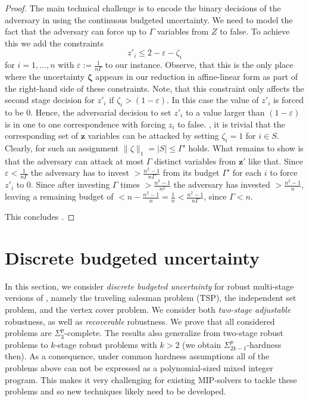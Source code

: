 \begin{proof}
    The main technical challenge is to encode the binary decisions of the adversary 
    in {\radj} using the continuous budgeted uncertainty.
    We need to model the fact that the adversary can force up to $\Gamma$ variables from $Z$ to false.
    To achieve this we add the constraints
    \[ z'_i \leq 2 - \varepsilon - \zeta_i \]
    for $i=1,\dots,n$ with $\varepsilon := \frac{1}{n \Gamma}$ to our instance.
    Observe, that this is the only place where the uncertainty $\pmb{\zeta}$ appears in our 
    reduction  in affine-linear form as part of the right-hand side of these constraints.
    Note, that this constraint only affects the second stage decision for $z'_i$ if 
    $\zeta_i > (1-\varepsilon)$. In this case the value of $z'_i$ is forced to be $0$. Hence, the adversarial decision to set $z'_i$ to a value larger 
    than $(1-\varepsilon)$ is in one to one correspondence with forcing $z_i$ to false.
    ,
    it is trivial that the corresponding set of $\pmb{z}$ variables can be attacked by 
    setting $\zeta_i = 1$ for $i \in S$. Clearly, for such an assignment  $\| \zeta \|_1 = |S| \leq \Gamma'$ holds.
    What remains to show is that the adversary can attack at most $\Gamma$ distinct 
    variables from $\pmb{z}'$ like that.
    Since $\varepsilon < \frac{1}{n \Gamma}$ the adversary has to invest $ > \frac{n^2-1}{n \Gamma}$ from its budget $\Gamma'$ for each $i$ to
    force $z'_i$ to $0$.
    Since after investing $\Gamma$ times $ > \frac{n^2-1}{n^2}$ the adversary has invested $> \frac{n^2-1}{n}$,
    leaving a remaining budget of $< n - \frac{n^2-1}{n} = \frac{1}{n} < \frac{n^2-1}{n \Gamma}$, since $\Gamma < n$.

    This concludes .
\end{proof}


\section{Discrete budgeted uncertainty}
\label{sec:discbudgeted}

In this section, we consider \emph{discrete budgeted uncertainty} for robust multi-stage versions of , namely the traveling salesman problem (TSP), the independent set problem, and the vertex cover problem. We consider both \emph{two-stage adjustable} robustness, as well as \emph{recoverable} robustness. We prove that all considered problems are $\Sigma_3^p$-complete. The results also generalize from two-stage robust problems to $k$-stage robust problems with $k > 2$ (we obtain $\Sigma^p_{2k-1}$-hardness then). As a consequence, under common hardness assumptions all of the problems above can not be expressed as a polynomial-sized mixed integer program. This makes it very challenging for existing MIP-solvers to tackle these problems and so new techniques likely need to be developed.


